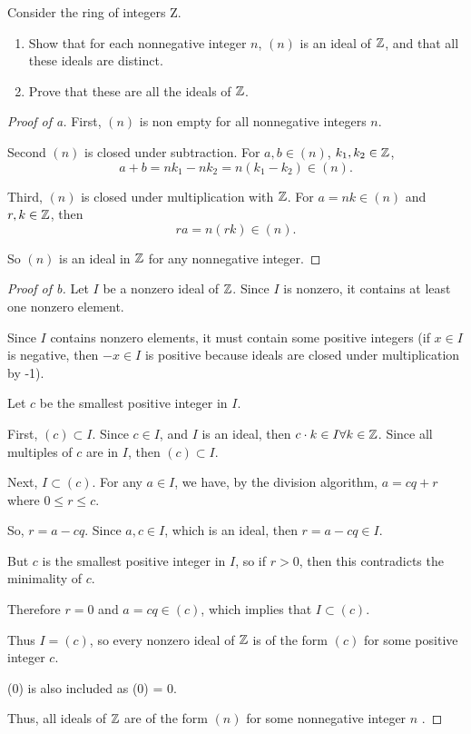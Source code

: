 \documentclass[../hw7]{subfiles}
\begin{document}
\begin{problem}
Consider the ring of integers Z.
\begin{enumerate}[label=\alph*)]
	\item  Show that for each nonnegative integer $n$, $(n)$ is an ideal of $\mathbb{Z}$, and that all these ideals are distinct.
	\item Prove that these are all the ideals of $\mathbb{Z}$.
\end{enumerate}
\end{problem}
\begin{proof}[Proof of a]
	First, $(n)$ is non empty for all nonnegative integers $n$.

	Second $(n)$ is closed under subtraction.
	For $a, b \in  (n)$, $k_1,k_2\in \mathbb{Z}$, \[
		a+b = nk_1-nk_2=n(k_1-k_2)\in (n)
		.\]

	Third, $(n)$ is closed under multiplication with  $\mathbb{Z}$.
	For $a = nk \in (n)$ and $r,k\in \mathbb{Z}$, then \[
		ra = n(rk)\in (n)
		.\]

	So $(n)$ is an ideal in  $\mathbb{Z}$ for any nonnegative integer.
\end{proof}
\begin{proof}[Proof of b]
	Let $I$  be a nonzero ideal of $\mathbb{Z}$.
	Since $I$  is nonzero, it contains at least one nonzero element.

	Since $I$ contains nonzero elements, it must contain some positive integers (if $x \in I$ is negative, then $-x \in I$ is positive because ideals are closed under multiplication by -1).

	Let $c$  be the smallest positive integer in $I$.

	First, $(c) \subset I$.
	Since $c\in I$, and $I$  is an ideal, then $c\cdot k\in I \forall k\in \mathbb{Z}$.
	Since all multiples of $c$ are in $I$, then  $(c)\subset I$.

	Next, $I\subset (c)$.
	For any $a\in I$, we have, by the division algorithm, $a=cq+r$ where $0\le r\le c$.

	So, $r=a-cq$.
	Since  $a,c\in I$, which is an ideal,
	then $r=a-cq\in I$.

	But $c$ is the smallest positive integer in  $I$,
	so if  $r>0$, then this contradicts the minimality of  $c$.

	Therefore $r=0$ and $a=cq \in (c)$, which implies that $I \subset (c)$.

	Thus $I=(c)$, so every nonzero ideal of $\mathbb{Z}$ is of the form $(c)$ for some positive integer $c$.

	(0) is also included as (0) = {0}.

	Thus, all ideals of $\mathbb{Z}$  are of the form $(n)$ for some nonnegative integer $n$ .
\end{proof}
\end{document}
